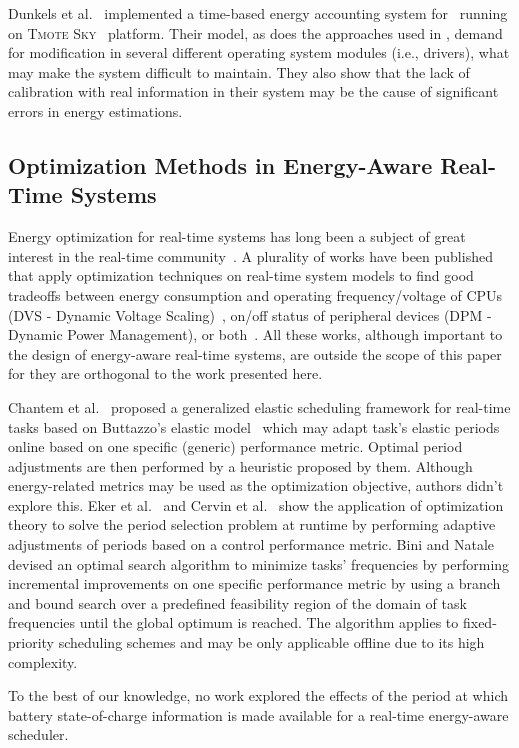 Dunkels et al.~\cite{Dunkels:2007} implemented a time-based energy accounting
system for \contiki~running on \textsc{Tmote Sky}~\cite{Polastre:2005} platform.
Their model, as does the approaches used in \tinyos, demand for modification in
several different operating system modules (i.e., drivers), what may make the
system difficult to maintain. They also show that the lack of calibration with
real information in their system may be the cause of significant errors in
energy estimations.

\subsection{Optimization Methods in Energy-Aware Real-Time Systems}

Energy optimization for real-time systems has long been a subject of great
interest in the real-time community~\cite{Weng:2003}. A plurality of
works have been published that apply optimization techniques on real-time system
models to find good tradeoffs between energy consumption and operating
frequency/voltage of CPUs (DVS - Dynamic Voltage Scaling)~\cite{Chen:2007},
on/off status of peripheral devices (DPM - Dynamic Power Management), or
both~\cite{Jha:2001}. All these works, although important to the design of
energy-aware real-time systems, are outside the scope of this paper for they are
orthogonal to the work presented here.

Chantem et al.~\cite{Chantem:2009} proposed a generalized elastic scheduling
framework for real-time tasks based on Buttazzo's elastic
model~\cite{Buttazzo:1998} which may adapt task's elastic periods online based
on one specific (generic) performance metric. Optimal period adjustments are
then performed by a heuristic proposed by them. Although energy-related metrics
may be used as the optimization objective, authors didn't explore this.
Eker et al.~\cite{Eker:2000} and Cervin et al.~\cite{Cervin:2002} show the
application of optimization theory to solve the period selection problem at
runtime by performing adaptive adjustments of periods based on a control
performance metric.
Bini and Natale~\cite{Bini:2005} devised an optimal search algorithm to minimize
tasks' frequencies by performing incremental improvements on one specific
performance metric by using a branch and bound search over a predefined
feasibility region of the domain of task frequencies until the global optimum is
reached. The algorithm applies to fixed-priority scheduling schemes and may be
only applicable offline due to its high complexity.

To the best of our knowledge, no work explored the effects of the period at
which battery state-of-charge information is made available for a real-time
energy-aware scheduler.
